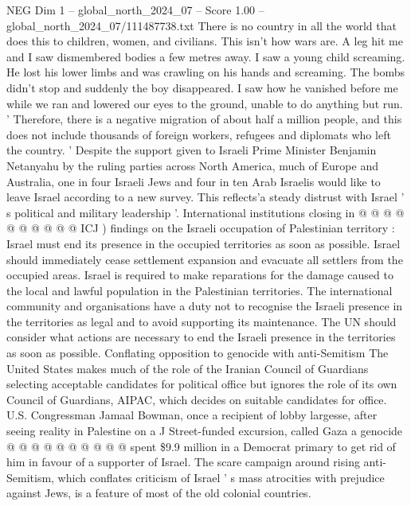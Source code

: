 \begin{textsample}{NEG Dim 1 – global\_north\_2024\_07 – Score 1.00 – global\_north\_2024\_07/111487738.txt}  \label{ex:f1_neg_273}
There is no country in all the world that does this to children, women, and civilians.
This isn't how wars are.
A leg hit me and I saw dismembered bodies a few metres away.
I saw a young child screaming.
He lost his lower limbs and was crawling on his hands and screaming.
The bombs didn't stop and suddenly the boy disappeared.
I saw how he vanished before me while we ran and lowered our eyes to the ground, unable to do anything but run. ' Therefore, there is a negative migration of about half a million people, and this does not include thousands of foreign workers, refugees and diplomats who left the country. ' Despite the support given to Israeli Prime Minister Benjamin Netanyahu by the ruling parties across North America, much of Europe and Australia, one in four Israeli Jews and four in ten Arab Israelis would like to leave Israel according to a new survey.
This reflects'a steady distrust with Israel ' s political and military leadership '.
International institutions closing in @ @ @ @ @ @ @ @ @ @ ICJ ) findings on the Israeli occupation of Palestinian territory : Israel must end its presence in the occupied territories as soon as possible.
Israel should immediately cease settlement expansion and evacuate all settlers from the occupied areas.
Israel is required to make reparations for the damage caused to the local and lawful population in the Palestinian territories.
The international community and organisations have a duty not to recognise the Israeli presence in the territories as legal and to avoid supporting its maintenance.
The UN should consider what actions are necessary to end the Israeli presence in the territories as soon as possible.
Conflating opposition to genocide with anti-Semitism The United States makes much of the role of the Iranian Council of Guardians selecting acceptable candidates for political office but ignores the role of its own Council of Guardians, AIPAC, which decides on suitable candidates for office.
U.S.
Congressman Jamaal Bowman, once a recipient of lobby largesse, after seeing reality in Palestine on a J Street-funded excursion, called Gaza a genocide @ @ @ @ @ @ @ @ @ @ spent \$9.9 million in a Democrat primary to get rid of him in favour of a supporter of Israel.
The scare campaign around rising anti-Semitism, which conflates criticism of Israel ' s mass atrocities with prejudice against Jews, is a feature of most of the old colonial countries.

\end{textsample}
